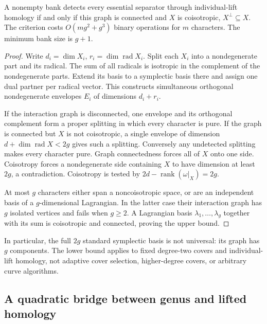 \begin{samepage}
\begin{proposition}
A nonempty bank detects every essential separator through individual-lift
homology if and only if this graph is connected and $X$ is coisotropic,
$X^\perp\subseteq X$. The criterion costs $O(mg^2+g^3)$ binary operations
for $m$ characters. The minimum bank size is $g+1$.
\end{proposition}
\end{samepage}
\begin{proof}
Write $d_i=\dim X_i$, $r_i=\dim\operatorname{rad}X_i$. Split each $X_i$
into a nondegenerate part and its radical. The sum of all radicals is
isotropic in the complement of the nondegenerate parts. Extend its basis
to a symplectic basis there and assign one dual partner per radical vector.
This constructs simultaneous orthogonal nondegenerate envelopes $E_i$
of dimensions $d_i+r_i$.

If the interaction graph is disconnected, one envelope and its orthogonal
complement form a proper splitting in which every character is pure.
If the graph is connected but $X$ is not coisotropic, a single envelope
of dimension $d+\dim\operatorname{rad}X<2g$ gives such a splitting.
Conversely any undetected splitting makes every character pure. Graph
connectedness forces all of $X$ onto one side. Coisotropy forces a
nondegenerate side containing $X$ to have dimension at least $2g$, a
contradiction. Coisotropy is tested by
$2d-\operatorname{rank}(\omega|_X)=2g$.

At most $g$ characters either span a noncoisotropic space, or are an
independent basis of a $g$-dimensional Lagrangian. In the latter case their
interaction graph has $g$ isolated vertices and fails when $g\ge2$.
A Lagrangian basis $\lambda_1,\ldots,\lambda_g$ together with its sum
is coisotropic and connected, proving the upper bound.
\end{proof}

In particular, the full $2g$ standard symplectic basis is not universal:
its graph has $g$ components. The lower bound applies to fixed degree-two
covers and individual-lift homology, not adaptive cover selection,
higher-degree covers, or arbitrary curve algorithms.

\subsection{A quadratic bridge between genus and lifted homology}

